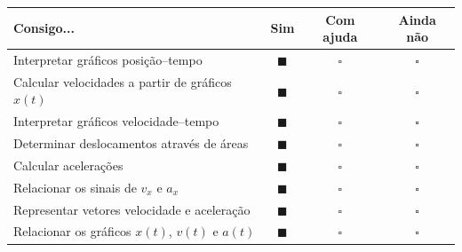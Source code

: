 \documentclass[11pt,a4paper]{article}
\begin{document}
	\begin{center}
		
		\renewcommand{\arraystretch}{1.45}
		
		\begin{tabularx}{\textwidth}{Xccc}
			
			\toprule
			
			\textbf{Consigo...}
			&
			\textbf{Sim}
			&
			\textbf{Com ajuda}
			&
			\textbf{Ainda não}
			
			\\
			
			\midrule
			
			Interpretar gráficos posição--tempo
			&
			$\blacksquare$
			&
			$\square$
			&
			$\square$
			\\
			
			Calcular velocidades a partir de gráficos $x(t)$
			&
			$\blacksquare$
			&
			$\square$
			&
			$\square$
			\\
			
			Interpretar gráficos velocidade--tempo
			&
			$\blacksquare$
			&
			$\square$
			&
			$\square$
			\\
			
			Determinar deslocamentos através de áreas
			&
			$\blacksquare$
			&
			$\square$
			&
			$\square$
			\\
			
			Calcular acelerações
			&
			$\blacksquare$
			&
			$\square$
			&
			$\square$
			\\
			
			Relacionar os sinais de $v_x$ e $a_x$
			&
			$\blacksquare$
			&
			$\square$
			&
			$\square$
			\\
			
			Representar vetores velocidade e aceleração
			&
			$\blacksquare$
			&
			$\square$
			&
			$\square$
			\\
			
			Relacionar os gráficos $x(t)$, $v(t)$ e $a(t)$
			&
			$\blacksquare$
			&
			$\square$
			&
			$\square$
			\\
			
			\bottomrule
			
		\end{tabularx}
		
	\end{center}
	
	\vfill
	
	
\end{document}
